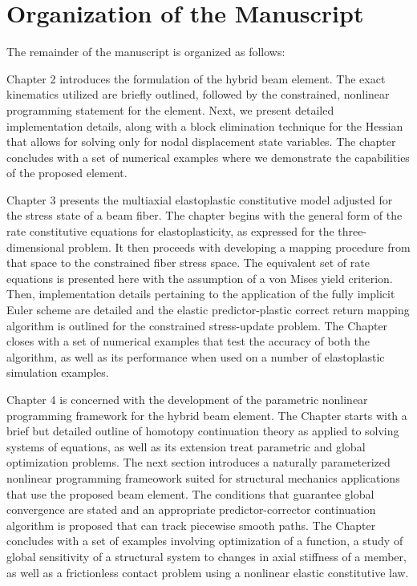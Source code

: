 \section{Organization of the Manuscript}
The remainder of the manuscript is organized as follows: 

Chapter 2 introduces the formulation of the hybrid beam element. The exact kinematics 
utilized are briefly outlined, followed by the constrained, nonlinear programming 
statement for the element. Next, we present detailed implementation details, along 
with a block elimination technique for the Hessian that allows for solving only for 
nodal displacement state variables. The chapter concludes with a set of numerical 
examples where we demonstrate the capabilities of the proposed element.

Chapter 3 presents the multiaxial elastoplastic constitutive model adjusted for the 
stress state of a beam fiber. The chapter begins with the general form of the rate 
constitutive equations for elastoplasticity, as expressed for the three-dimensional 
problem. It then proceeds with developing a mapping procedure from that space to the 
constrained fiber stress space. The equivalent set of rate equations is presented here 
with the assumption of a von Mises yield criterion. Then, implementation details 
pertaining to the application of the fully implicit Euler scheme are detailed and the 
elastic predictor-plastic correct return mapping algorithm is outlined for the 
constrained stress-update problem. The Chapter closes with a set of numerical examples 
that test the accuracy of both the algorithm, as well as its performance when used on 
a number of elastoplastic simulation examples.

Chapter 4 is concerned with the development of the parametric nonlinear programming 
framework for the hybrid beam element. The Chapter starts with a brief but detailed 
outline of homotopy continuation theory as applied to solving systems of equations, as 
well as its extension treat parametric and global optimization problems. The next 
section introduces a naturally parameterized nonlinear programming frameowork suited 
for structural mechanics applications that use the proposed beam element. The 
conditions that guarantee global convergence are stated and an appropriate 
predictor-corrector continuation algorithm is proposed that can track piecewise smooth 
paths. The Chapter concludes with a set of examples involving optimization of a 
function, a study of global sensitivity of a structural system to changes in axial 
stiffness of a member, as well as a frictionless contact problem using a nonlinear 
elastic constitutive law.

